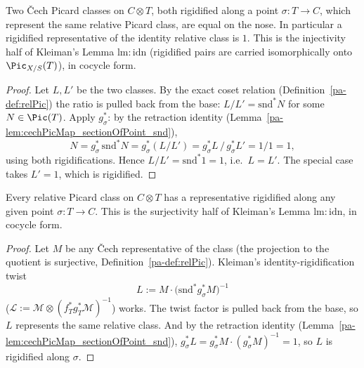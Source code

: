 \begin{theorem}
  \label{pa-thm:isRigidified_eq_of_relPicMk_eq}
  \leanok

  Two \v Cech Picard classes on \(C \otimes T\), both rigidified along a point
  \(\sigma \colon T \to C\), which represent the same relative Picard class, are equal on the
  nose. In particular a rigidified representative of the identity relative class is \(1\).
  This is the injectivity half of Kleiman's Lemma \(\mathrm{lm{:}idn}\) (rigidified pairs are
  carried isomorphically onto \(\Pic_{X/S}(T)\)), in cocycle form.
\end{theorem}
\begin{proof}
  \leanok
  Let \(L, L'\) be the two classes. By the exact coset relation
  (Definition~\ref{pa-def:relPic}) the ratio is pulled back from the base: \(L/L' =
  \mathrm{snd}^{*} N\) for some \(N \in \Pic(T)\). Apply \(g_\sigma^{*}\): by the retraction
  identity (Lemma~\ref{pa-lem:cechPicMap_sectionOfPoint_snd}),
  \[
    N = g_\sigma^{*}\,\mathrm{snd}^{*} N = g_\sigma^{*}(L/L')
      = g_\sigma^{*}L \,/\, g_\sigma^{*}L' = 1/1 = 1 ,
  \]
  using both rigidifications. Hence \(L/L' = \mathrm{snd}^{*}1 = 1\), i.e.\ \(L = L'\). The
  special case takes \(L' = 1\), which is rigidified.
\end{proof}

\begin{theorem}
  \label{pa-thm:relPic_exists_isRigidified_rep}
  \leanok

  Every relative Picard class on \(C \otimes T\) has a representative rigidified along any
  given point \(\sigma \colon T \to C\). This is the surjectivity half of Kleiman's Lemma
  \(\mathrm{lm{:}idn}\), in cocycle form.
\end{theorem}
\begin{proof}
  \leanok
  Let \(M\) be any \v Cech representative of the class (the projection to the quotient is
  surjective, Definition~\ref{pa-def:relPic}). Kleiman's identity-rigidification twist
  \[
    L := M \cdot \bigl(\mathrm{snd}^{*} g_\sigma^{*} M\bigr)^{-1}
  \]
  (\(\mathcal L := \mathcal M \otimes (f_T^{*} g_T^{*} \mathcal M)^{-1}\)) works. The twist factor is pulled
  back from the base, so \(L\) represents the same relative class. And by the retraction
  identity (Lemma~\ref{pa-lem:cechPicMap_sectionOfPoint_snd}),
  \(g_\sigma^{*} L = g_\sigma^{*} M \cdot (g_\sigma^{*} M)^{-1} = 1\), so \(L\) is
  rigidified along \(\sigma\).
\end{proof}

